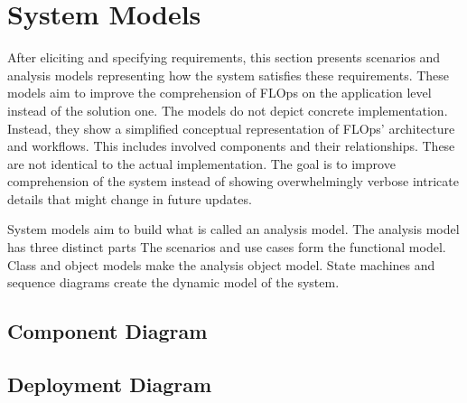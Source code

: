 \section{System Models}

After eliciting and specifying requirements, this section presents scenarios and analysis models representing how the system satisfies these requirements.
These models aim to improve the comprehension of FLOps on the application level instead of the solution one.
The models do not depict concrete implementation.
Instead, they show a simplified conceptual representation of FLOps' architecture and workflows.
This includes involved components and their relationships.
These are not identical to the actual implementation.
The goal is to improve comprehension of the system instead of showing overwhelmingly verbose intricate details that might change in future updates.

System models aim to build what is called an analysis model.
The analysis model has three distinct parts
The scenarios and use cases form the functional model.
Class and object models make the analysis object model.
State machines and sequence diagrams create the dynamic model of the system.  \cite{book:bruegge}











\subsection{Component Diagram}
\subsection{Deployment Diagram}

